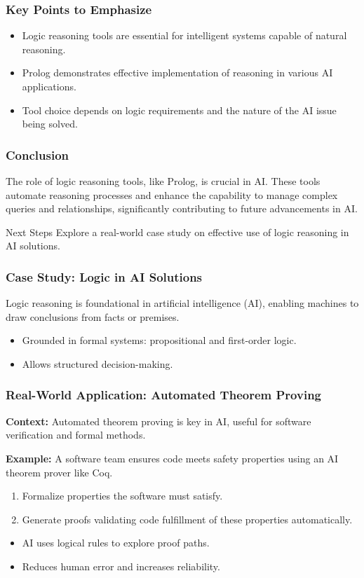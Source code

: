 \documentclass[aspectratio=169]{beamer}
\begin{document}
\begin{frame}
    \frametitle{Key Points to Emphasize}
    \begin{itemize}
        \item Logic reasoning tools are essential for intelligent systems capable of natural reasoning.
        \item Prolog demonstrates effective implementation of reasoning in various AI applications.
        \item Tool choice depends on logic requirements and the nature of the AI issue being solved.
    \end{itemize}
\end{frame}

\begin{frame}
    \frametitle{Conclusion}
    The role of logic reasoning tools, like Prolog, is crucial in AI. These tools automate reasoning processes and enhance the capability to manage complex queries and relationships, significantly contributing to future advancements in AI.

    \begin{block}{Next Steps}
        Explore a real-world case study on effective use of logic reasoning in AI solutions.
    \end{block}
\end{frame}

\begin{frame}[fragile]
    \frametitle{Case Study: Logic in AI Solutions}
    Logic reasoning is foundational in artificial intelligence (AI), enabling machines to draw conclusions from facts or premises. 
    \begin{itemize}
        \item Grounded in formal systems: propositional and first-order logic.
        \item Allows structured decision-making.
    \end{itemize}
\end{frame}

\begin{frame}[fragile]
    \frametitle{Real-World Application: Automated Theorem Proving}
    \textbf{Context:} Automated theorem proving is key in AI, useful for software verification and formal methods.
    
    \textbf{Example:} A software team ensures code meets safety properties using an AI theorem prover like Coq.
    \begin{enumerate}
        \item Formalize properties the software must satisfy.
        \item Generate proofs validating code fulfillment of these properties automatically.
    \end{enumerate}
    
    \begin{itemize}
        \item AI uses logical rules to explore proof paths.
        \item Reduces human error and increases reliability.
    \end{itemize}
\end{frame}
\end{document}
